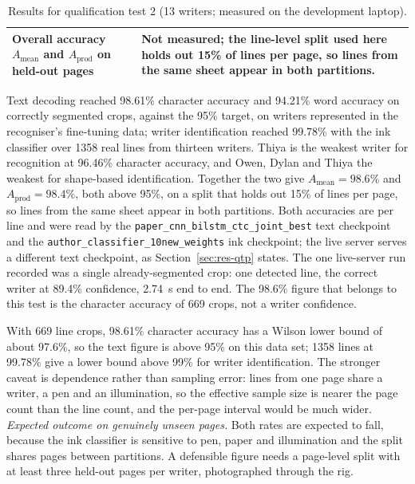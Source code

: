 \begin{table}[h]
\begin{tabularx}{\linewidth}{|>{\raggedright\arraybackslash}p{4.9cm}|>{\raggedright\arraybackslash}X|}
\hline
Overall accuracy $A_{\mathrm{mean}}$ and $A_{\mathrm{prod}}$ on held-out pages & Not measured; the line-level split used here holds out 15\% of lines per page, so lines from the same sheet appear in both partitions. \\
\hline
\end{tabularx}
\caption{Results for qualification test 2 (13 writers; measured on the development laptop).}
\label{tab:res-r2}
\end{table}



            Text decoding reached 98.61\% character accuracy and 94.21\% word accuracy on correctly segmented crops, against the 95\% target, on writers represented in the recogniser's fine-tuning data; writer identification reached 99.78\% with the ink classifier over 1358 real lines from thirteen writers.
            Thiya is the weakest writer for recognition at 96.46\% character accuracy, and Owen, Dylan and Thiya the weakest for shape-based identification.
            Together the two give $A_{\mathrm{mean}}=98.6\%$ and $A_{\mathrm{prod}}=98.4\%$, both above 95\%, on a split that holds out 15\% of lines per page, so lines from the same sheet appear in both partitions.
            Both accuracies are per line and were read by the \texttt{paper\_cnn\_bilstm\_ctc\_joint\_best} text checkpoint and the \texttt{author\_classifier\_10new\_weights} ink checkpoint; the live server serves a different text checkpoint, as Section~\ref{sec:res-qtp} states.
            The one live-server run recorded was a single already-segmented crop: one detected line, the correct writer at 89.4\% confidence, 2.74~s end to end. The 98.6\% figure that belongs to this test is the character accuracy of 669 crops, not a writer confidence.


            With 669 line crops, 98.61\% character accuracy has a Wilson lower bound of about 97.6\%, so the text figure is above 95\% on this data set; 1358 lines at 99.78\% give a lower bound above 99\% for writer identification.
            The stronger caveat is dependence rather than sampling error: lines from one page share a writer, a pen and an illumination, so the effective sample size is nearer the page count than the line count, and the per-page interval would be much wider.
            \emph{Expected outcome on genuinely unseen pages.}
            Both rates are expected to fall, because the ink classifier is sensitive to pen, paper and illumination and the split shares pages between partitions. A defensible figure needs a page-level split with at least three held-out pages per writer, photographed through the rig.

